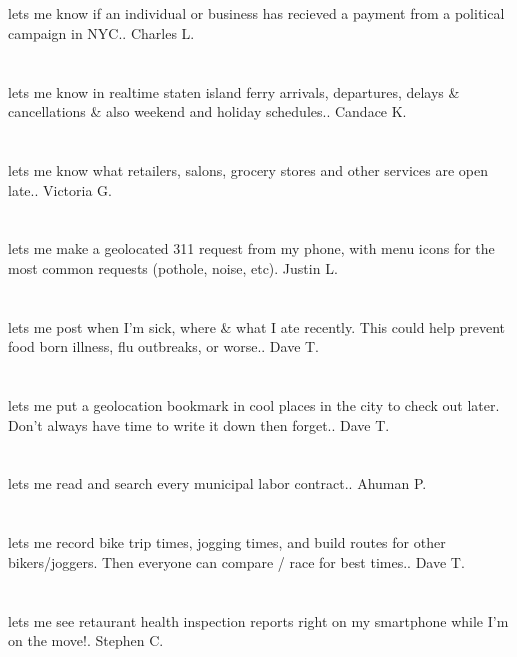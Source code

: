 \section{}lets me know if an individual or business has recieved a payment from a political campaign in NYC.. Charles L.
\section{}lets me know in realtime staten island ferry arrivals,  departures,  delays \& cancellations \& also weekend and holiday schedules.. Candace K.
\section{}lets me know what retailers,  salons,  grocery stores and other services are open late.. Victoria G.
\section{}lets me make a geolocated 311 request from my phone,  with menu icons for the most common requests (pothole,  noise,  etc). Justin L.
\section{}lets me post when I'm sick,  where \& what I ate recently.  This could help prevent food born illness,  flu outbreaks,  or worse.. Dave T.
\section{}lets me put a geolocation bookmark in cool places in the city to check out later. Don't always have time to write it down then forget.. Dave T.
\section{}lets me read and search every municipal labor contract.. Ahuman P.
\section{}lets me record bike trip times,  jogging times,  and build routes for other bikers/joggers. Then everyone can compare / race for best times.. Dave T.
\section{}lets me see retaurant health inspection reports right on my smartphone while I'm on the move!. Stephen C.
